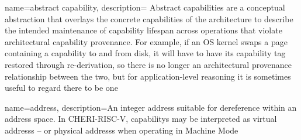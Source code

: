 {
  name=abstract capability,
  description={
    Abstract capabilities are a conceptual abstraction that overlays the
    concrete capabilities of the architecture to describe the intended
    maintenance of capability lifespan across operations that violate
    architectural \gls{capability provenance}.
    For example, if an OS kernel
    swaps a page containing a capability to and from disk,
    it will have to have its \gls{capability tag}
    restored through re-derivation, so there is no longer an
    architectural provenance relationship between the two, but for
    application-level reasoning it is sometimes useful to regard there
    to be one}
}

{
  name=address,
  description={An integer address suitable for dereference within an address
    space.
    In \gls{CHERI-RISC-V}, \glspl{capability} may be interpreted as
    \glspl{virtual address} -- or \glspl{physical address} when operating in
    Machine Mode}
}

